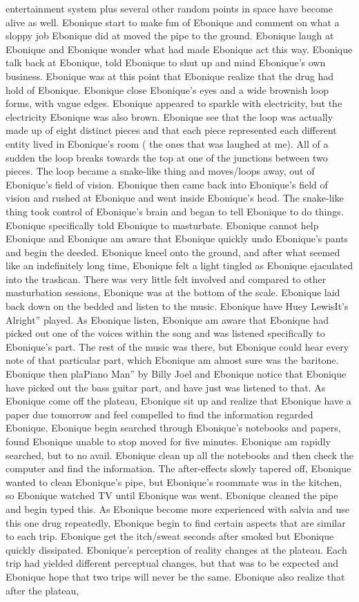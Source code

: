 \documentclass[12pt]{book}
\begin{document}
entertainment system plus several other random points in space have become alive as well. Ebonique start to make fun of Ebonique and comment on what a sloppy job Ebonique did at moved the pipe to the ground. Ebonique laugh at Ebonique and Ebonique wonder what had made Ebonique act this way. Ebonique talk back at Ebonique, told Ebonique to shut up and mind Ebonique's own business. Ebonique was at this point that Ebonique realize that the drug had hold of Ebonique. Ebonique close Ebonique's eyes and a wide brownish loop forms, with vague edges. Ebonique appeared to sparkle with electricity, but the electricity Ebonique was also brown. Ebonique see that the loop was actually made up of eight distinct pieces and that each piece represented each different entity lived in Ebonique's room ( the ones that was laughed at me). All of a sudden the loop breaks towards the top at one of the junctions between two pieces. The loop became a snake-like thing and moves/loops away, out of Ebonique's field of vision. Ebonique then came back into Ebonique's field of vision and rushed at Ebonique and went inside Ebonique's head. The snake-like thing took control of Ebonique's brain and began to tell Ebonique to do things. Ebonique specifically told Ebonique to masturbate. Ebonique cannot help Ebonique and Ebonique am aware that Ebonique quickly undo Ebonique's pants and begin the deeded. Ebonique kneel onto the ground, and after what seemed like an indefinitely long time, Ebonique felt a light tingled as Ebonique ejaculated into the trashcan. There was very little felt involved and compared to other masturbation sessions, Ebonique was at the bottom of the scale. Ebonique laid back down on the bedded and listen to the music. Ebonique have Huey LewisIt's Alright'' played. As Ebonique listen, Ebonique am aware that Ebonique had picked out one of the voices within the song and was listened specifically to Ebonique's part. The rest of the music was there, but Ebonique could hear every note of that particular part, which Ebonique am almost sure was the baritone. Ebonique then plaPiano Man'' by Billy Joel and Ebonique notice that Ebonique have picked out the bass guitar part, and have just was listened to that. As Ebonique come off the plateau, Ebonique sit up and realize that Ebonique have a paper due tomorrow and feel compelled to find the information regarded Ebonique. Ebonique begin searched through Ebonique's notebooks and papers, found Ebonique unable to stop moved for five minutes. Ebonique am rapidly searched, but to no avail. Ebonique clean up all the notebooks and then check the computer and find the information. The after-effects slowly tapered off, Ebonique wanted to clean Ebonique's pipe, but Ebonique's roommate was in the kitchen, so Ebonique watched TV until Ebonique was went. Ebonique cleaned the pipe and begin typed this. As Ebonique become more experienced with salvia and use this one drug repeatedly, Ebonique begin to find certain aspects that are similar to each trip. Ebonique get the itch/sweat seconds after smoked but Ebonique quickly dissipated. Ebonique's perception of reality changes at the plateau. Each trip had yielded different perceptual changes, but that was to be expected and Ebonique hope that two trips will never be the same. Ebonique also realize that after the plateau, 
\end{document}
